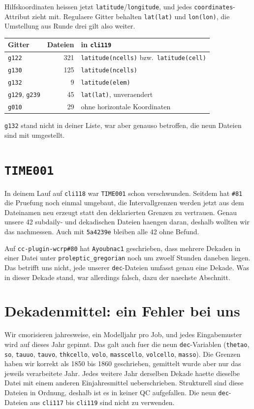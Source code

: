 \documentclass[11pt,a4paper]{article}
\newcommand{\code}[1]{\texttt{\small #1}}
\begin{document}
Hilfskoordinaten heissen jetzt \code{latitude}/\code{longitude}, und jedes
\code{coordinates}-Attribut zieht mit. Regulaere Gitter behalten \code{lat(lat)}
und \code{lon(lon)}, die Umstellung aus Runde drei gilt also weiter.

\begin{center}
\begin{tabular}{lrl}
\toprule
\textbf{Gitter} & \textbf{Dateien} & \textbf{in \code{cli119}} \\
\midrule
\code{g122} & 321 & \code{latitude(ncells)} bzw.\ \code{latitude(cell)} \\
\code{g130} & 125 & \code{latitude(ncells)} \\
\code{g132} &   9 & \code{latitude(elem)} \\
\code{g129}, \code{g239} & 45 & \code{lat(lat)}, unveraendert \\
\code{g010} & 29 & ohne horizontale Koordinaten \\
\bottomrule
\end{tabular}
\end{center}

\code{g132} stand nicht in deiner Liste, war aber genauso betroffen, die neun
Dateien sind mit umgestellt.

\section{\code{TIME001}}

In deinem Lauf auf \code{cli118} war \code{TIME001} schon verschwunden. Seitdem hat
\code{\#81} die Pruefung noch einmal umgebaut, die Intervallgrenzen werden jetzt
aus dem Dateinamen neu erzeugt statt den deklarierten Grenzen zu vertrauen. Genau
unsere 42 subdaily- und dekadischen Dateien haengen daran, deshalb wollten wir das
nachmessen. Auch mit \code{5a4239e} bleiben alle 42 ohne Befund.

Auf \code{cc-plugin-wcrp\#80} hat \code{Ayoubnac1} geschrieben, dass mehrere Dekaden in einer
Datei unter \code{proleptic\_gregorian} noch um zwoelf Stunden daneben liegen. Das
betrifft uns nicht, jede unserer \code{dec}-Dateien umfasst genau eine Dekade.
Was in dieser Dekade stand, war allerdings falsch, dazu der naechste Abschnitt.

\section{Dekadenmittel: ein Fehler bei uns}
\label{sec:dec}

Wir cmorisieren jahresweise, ein Modelljahr pro Job, und jedes Eingabemuster wird
auf dieses Jahr gepinnt. Das galt auch fuer die neun \code{dec}-Variablen
(\code{thetao}, \code{so}, \code{tauuo}, \code{tauvo}, \code{thkcello}, \code{volo},
\code{masscello}, \code{volcello}, \code{masso}). Die Grenzen haben wir korrekt als
1850 bis 1860 geschrieben, gemittelt wurde aber nur das jeweils verarbeitete Jahr.
Jedes weitere Jahr derselben Dekade haette dieselbe Datei mit einem anderen
Einjahresmittel ueberschrieben. Strukturell sind diese Dateien in Ordnung, deshalb
ist es in keiner QC aufgefallen. Die neun \code{dec}-Dateien aus \code{cli117} bis
\code{cli119} sind nicht zu verwenden.
\end{document}
